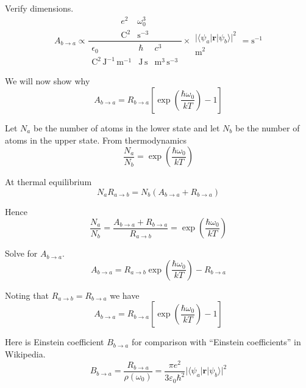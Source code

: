 Verify dimensions.
\begin{equation*}
A_{b\rightarrow a}\propto
\frac{
\begin{matrix}
e^2 & \omega_0^3
\\
\text{C}^2 & \text{s}^{-3}
\end{matrix}
}
{
\begin{matrix}
\epsilon_0 & \hbar & c^3
\\
\text{C}^2\,\text{J}^{-1}\,\text{m}^{-1}
& \text{J}\,\text{s}
& \text{m}^3\,\text{s}^{-3}
\end{matrix}
}
\times
\begin{matrix}
\\
\bigl|\langle\psi_a|\mathbf r|\psi_b\rangle\bigr|^2
\\
\text{m}^2
\end{matrix}
=\text{s}^{-1}
\end{equation*}

We will now show why
\begin{equation*}
A_{b\rightarrow a}=R_{b\rightarrow a}
\left[\exp\left(\frac{\hbar\omega_0}{kT}\right)-1\right]
\end{equation*}

Let $N_a$ be the number of atoms in the lower state and let $N_b$ be
the number of atoms in the upper state.
From thermodynamics
\begin{equation*}
\frac{N_a}{N_b}=\exp\left(\frac{\hbar\omega_0}{kT}\right)
\end{equation*}

At thermal equilibrium
\begin{equation*}
N_aR_{a\rightarrow b}=N_b(A_{b\rightarrow a}+R_{b\rightarrow a})
\end{equation*}

Hence
\begin{equation*}
\frac{N_a}{N_b}=\frac{A_{b\rightarrow a}+R_{b\rightarrow a}}{R_{a\rightarrow b}}
=\exp\left(\frac{\hbar\omega_0}{kT}\right)
\end{equation*}

Solve for $A_{b\rightarrow a}$.
\begin{equation*}
A_{b\rightarrow a}=R_{a\rightarrow b}\exp\left(\frac{\hbar\omega_0}{kT}\right)-R_{b\rightarrow a}
\end{equation*}

Noting that $R_{a\rightarrow b}=R_{b\rightarrow a}$ we have
\begin{equation*}
A_{b\rightarrow a}
=R_{b\rightarrow a}\left[\exp\left(\frac{\hbar\omega_0}{kT}\right)-1\right]
\end{equation*}

Here is Einstein coefficient $B_{b\rightarrow a}$ for comparison with
``Einstein coefficients'' in Wikipedia.
\begin{equation*}
B_{b\rightarrow a}=\frac{R_{b\rightarrow a}}{\rho(\omega_0)}
=\frac{\pi e^2}{3\varepsilon_0\hbar^2}
\bigl|\langle\psi_a|\mathbf r|\psi_b\rangle\bigr|^2
\end{equation*}


